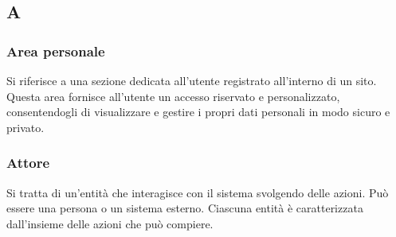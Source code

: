 \subsection{A}
\subsubsection{Area personale}
Si riferisce a una sezione dedicata all'utente registrato all'interno di un sito. 
Questa area fornisce all'utente un accesso riservato e personalizzato, consentendogli di visualizzare e gestire i propri dati personali in modo sicuro e privato. 

\subsubsection{Attore}
Si tratta di un'entità che interagisce con il sistema svolgendo delle azioni.
Può essere una persona o un sistema esterno. Ciascuna entità è caratterizzata
dall'insieme delle azioni che può compiere.

\newpage
